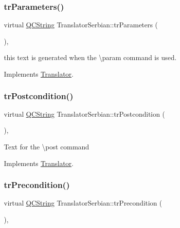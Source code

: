 \subsubsection{\texorpdfstring{trParameters()}{trParameters()}}
{\footnotesize\ttfamily virtual \mbox{\hyperlink{class_q_c_string}{Q\+C\+String}} Translator\+Serbian\+::tr\+Parameters (\begin{DoxyParamCaption}{ }\end{DoxyParamCaption})\hspace{0.3cm}{\ttfamily [inline]}, {\ttfamily [virtual]}}

this text is generated when the \textbackslash{}param command is used. 

Implements \mbox{\hyperlink{class_translator}{Translator}}.

\mbox{\label{class_translator_serbian_a4bf8f7ff9f2980ffb7fb13ebddf06c40}} 
\subsubsection{\texorpdfstring{trPostcondition()}{trPostcondition()}}
{\footnotesize\ttfamily virtual \mbox{\hyperlink{class_q_c_string}{Q\+C\+String}} Translator\+Serbian\+::tr\+Postcondition (\begin{DoxyParamCaption}{ }\end{DoxyParamCaption})\hspace{0.3cm}{\ttfamily [inline]}, {\ttfamily [virtual]}}

Text for the \textbackslash{}post command 

Implements \mbox{\hyperlink{class_translator}{Translator}}.

\mbox{\label{class_translator_serbian_a891e6e79429d1a09adcaad0a25774a34}} 
\subsubsection{\texorpdfstring{trPrecondition()}{trPrecondition()}}
{\footnotesize\ttfamily virtual \mbox{\hyperlink{class_q_c_string}{Q\+C\+String}} Translator\+Serbian\+::tr\+Precondition (\begin{DoxyParamCaption}{ }\end{DoxyParamCaption})\hspace{0.3cm}{\ttfamily [inline]}, {\ttfamily [virtual]}}

